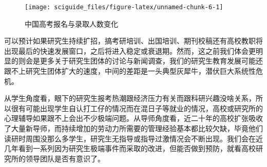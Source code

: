 \documentclass[]{tufte-book}
\newenvironment{Shaded}{}{}
\newcommand{\AttributeTok}[1]{\textcolor[rgb]{0.49,0.56,0.16}{#1}}
\newcommand{\CommentTok}[1]{\textcolor[rgb]{0.38,0.63,0.69}{\textit{#1}}}
\newcommand{\DecValTok}[1]{\textcolor[rgb]{0.25,0.63,0.44}{#1}}
\newcommand{\FunctionTok}[1]{\textcolor[rgb]{0.02,0.16,0.49}{#1}}
\newcommand{\NormalTok}[1]{#1}
\newcommand{\OtherTok}[1]{\textcolor[rgb]{0.00,0.44,0.13}{#1}}
\newcommand{\SpecialCharTok}[1]{\textcolor[rgb]{0.25,0.44,0.63}{#1}}
\newcommand{\StringTok}[1]{\textcolor[rgb]{0.25,0.44,0.63}{#1}}
\begin{document}
\begin{Shaded}
\end{Shaded}

\begin{figure}
\texttt{[image: sciguide\_files/figure-latex/unnamed-chunk-6-1]} \caption[中国高考报名与录取人数变化]{中国高考报名与录取人数变化}\label{fig:unnamed-chunk-6}
\end{figure}

可以预计如果研究生持续扩招，搞考研培训、出国培训、期刊校稿还有高校教职将出现最后的快速发展窗口，之后将进入稳定或衰退期。然而，这之前我们体会更明显的则会是更多关于研究生团体的讨论与新闻调查，我们的研究生教育发展可能还跟不上研究生团体扩大的速度，中间的差距是一头典型灰犀牛，潜伏巨大系统性危机。

从学生角度看，眼下的研究生报考热潮跟经济压力有关而跟科研兴趣没啥关系，所以很有可能出现学生自认打工仔的情况而在混日子等就业的情况，高校或研究所的心理辅导如果跟不上会出不少极端问题。从导师角度看，近二十年的高校扩张吸收了大量新导师，而持续增加的劳动力所需要的管理经验基本都比较欠缺，毕竟他们读研时周围没那么多学生，研究生无指导或指导过激情况会不断出现。我们会在近几年看到一系列因为研究生极端事件而采取的改进，但能否做到预防，就看高校研究所的领导团队是否有意识了。
\end{document}

